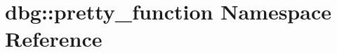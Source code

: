\hypertarget{namespacedbg_1_1pretty__function}{}\section{dbg\+:\+:pretty\+\_\+function Namespace Reference}
\label{namespacedbg_1_1pretty__function}
